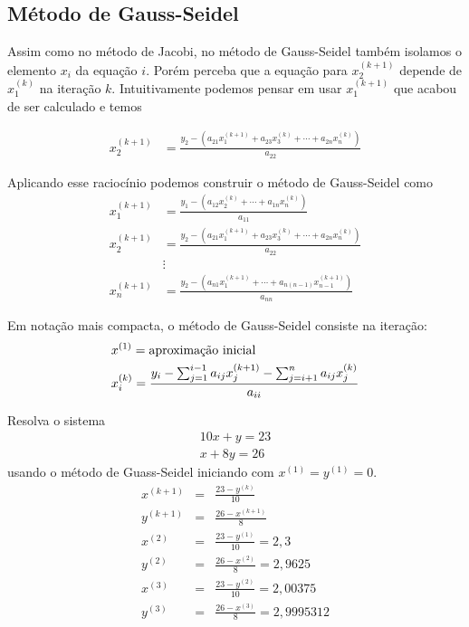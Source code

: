 
\fi

\subsection{Método de Gauss-Seidel}

Assim como no método de Jacobi, no método de Gauss-Seidel também isolamos o elemento $x_i$ da equação $i$. Porém perceba que a equação para $x_2^{(k+1)}$ depende de $x_1^{(k)}$ na iteração $k$. Intuitivamente podemos pensar em usar $x_1^{(k+1)}$ que acabou de ser calculado e temos

\begin{align}
x_2^{(k+1)}&=\frac{y_2 - \left(a_{21}x_1^{(k+1)}+a_{23}x_3^{(k)}+\cdots+a_{2n}x_n^{(k)}\right)}{a_{22}}
\end{align}

Aplicando esse raciocínio podemos construir o método de Gauss-Seidel como
\begin{align*}
x_1^{(k+1)}&=\frac{y_1 - \left(a_{12}x_2^{(k)}+\cdots+a_{1n}x_n^{(k)}\right)}{a_{11}}\\
x_2^{(k+1)}&=\frac{y_2 - \left(a_{21}x_1^{(k+1)}+a_{23}x_3^{(k)}+\cdots+a_{2n}x_n^{(k)}\right)}{a_{22}}\\
&\vdots\\
x_n^{(k+1)}&=\frac{y_2 - \left(a_{n1}x_1^{(k+1)}+\cdots+a_{n(n-1)}x_{n-1}^{(k+1)}\right)}{a_{nn}}
\end{align*}

Em notação mais compacta, o método de Gauss-Seidel consiste na iteração:
\begin{align*}\displaystyle
  &x^{(1)} = \text{aproximação inicial}\\
  &x_i^{(k)} = \frac{y_i - \sum_{j=1}^{i-1} a_{ij}x_j^{(k+1)} -\sum_{j=i+1}^{n} a_{ij}x_j^{(k)}}{a_{ii}}
\end{align*}

\begin{ex}
Resolva o sistema
\begin{align*}
10x+y=23\\
x+8y=26
\end{align*}
usando o método de Guass-Seidel iniciando com $x^{(1)}=y^{(1)}=0$.
\begin{eqnarray*}
x^{(k+1)}&=&\frac{23-y^{(k)}}{10}\\
y^{(k+1)}&=&\frac{26-x^{(k+1)}}{8}\\
x^{(2)}&=&\frac{23-y^{(1)}}{10}=2,3\\
y^{(2)}&=&\frac{26-x^{(2)}}{8}=2,9625\\
x^{(3)}&=&\frac{23-y^{(2)}}{10}=2,00375  \\
y^{(3)}&=&\frac{26-x^{(3)}}{8}=2,9995312
\end{eqnarray*}
\end{ex}


